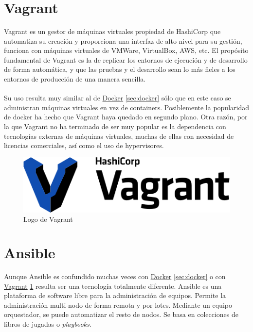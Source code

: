 \section{Vagrant}\label{sec:vagrant}

\paragraph{}Vagrant es un gestor de máquinas virtuales propiedad de HashiCorp que automatiza
su creación y proporciona una interfaz de alto nivel para su gestión, funciona con máquinas
virtuales de VMWare, VirtualBox, AWS, etc. El propósito fundamental de Vagrant es la de
replicar los entornos de ejecución y de desarrollo de forma automática, y que las pruebas
y el desarrollo sean lo más fieles a los entornos de producción de una manera sencilla.

\paragraph{}Su uso resulta muy similar al de \hyperref[sec:docker]{Docker} \ref{sec:docker}
sólo que en este caso se administran máquinas virtuales en vez de containers. Posiblemente
la popularidad de docker ha hecho que Vagrant haya quedado en segundo plano. Otra razón,
por la que Vagrant no ha terminado de ser muy popular es la dependencia con tecnologías
externas de máquinas virtuales, muchas de ellas con necesidad de licencias comerciales,
así como el uso de hypervisores.

\begin{figure}[H]
	\centering
	\includegraphics[width=0.50\linewidth]{imgs/vagrant-logo}
	\caption[Vagrant Logo]{Logo de Vagrant}
	\label{fig:vagrant}
\end{figure}

\section{Ansible}\label{sec:ansible}

\paragraph{}Aunque Ansible es confundido muchas veces con \hyperref[sec:docker]{Docker} \ref{sec:docker}
o con \hyperref[sec:vagrant]{Vagrant} \ref{sec:vagrant} resulta ser una tecnología
totalmente diferente. Ansible es una plataforma de software libre para la administración
de equipos. Permite la administración multi-nodo de forma remota y por lotes. Mediante
un equipo orquestador, se puede automatizar el resto de nodos. Se basa en colecciones
de libros de jugadas o \emph{playbooks}.

